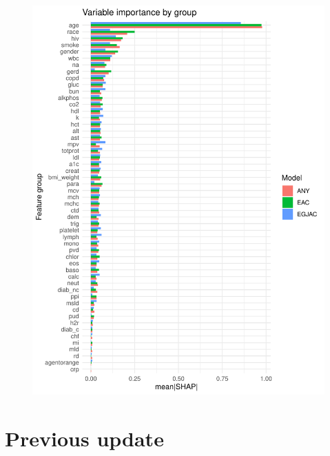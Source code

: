 \documentclass[12pt]{article}
\begin{document}
\begin{figure}[ht]
\includegraphics[width=1.0\linewidth]{variable_importance/shap_group.pdf}
\end{figure}


\newpage
\clearpage

\section*{Previous update}
\end{document}
